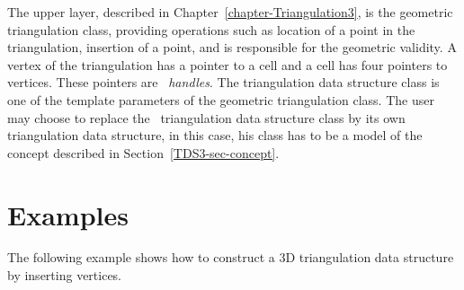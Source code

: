 The upper layer, described in Chapter~\ref{chapter-Triangulation3}, is
the geometric triangulation class, providing operations such as
location of a point in the triangulation, insertion of a point, and is
responsible for the geometric validity. A vertex of the triangulation
has a pointer to a cell and a cell has four pointers to
vertices. These pointers are \cgal\ \emph{handles}. The triangulation
data structure class is one of the template parameters of the
geometric triangulation class. The user may choose to replace the
\cgal\ triangulation data structure class by its own triangulation
data structure, in this case, his class has to be a model of the
concept described in Section~\ref{TDS3-sec-concept}.

\section{Examples}
\label{TDS3-sec-examples}
The following example shows how to construct a 3D triangulation data
structure by inserting vertices.
